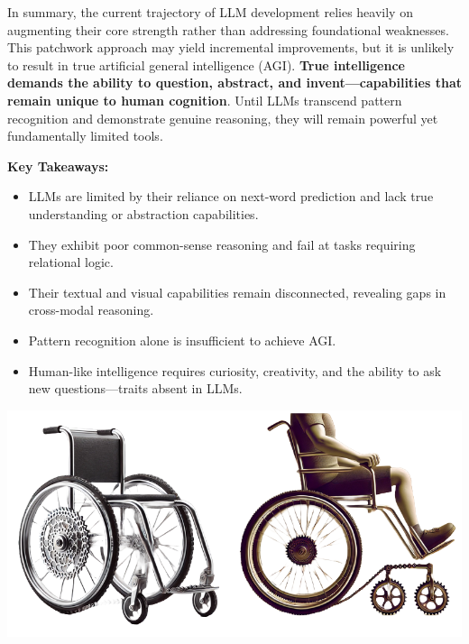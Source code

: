 \documentclass[11pt]{scrartcl}
\begin{document}
In summary, the current trajectory of LLM development relies heavily on augmenting their core strength rather than addressing foundational weaknesses. This patchwork approach may yield incremental improvements, but it is unlikely to result in true artificial general intelligence (AGI). \textbf{True intelligence demands the ability to question, abstract, and invent—capabilities that remain unique to human cognition}. Until LLMs transcend pattern recognition and demonstrate genuine reasoning, they will remain powerful yet fundamentally limited tools.

\vspace{1em}
\noindent
\textbf{Key Takeaways:}
\begin{itemize}
    \item LLMs are limited by their reliance on next-word prediction and lack true understanding or abstraction capabilities.
    \item They exhibit poor common-sense reasoning and fail at tasks requiring relational logic.
    \item Their textual and visual capabilities remain disconnected, revealing gaps in cross-modal reasoning.
    \item Pattern recognition alone is insufficient to achieve AGI.
    \item Human-like intelligence requires curiosity, creativity, and the ability to ask new questions—traits absent in LLMs.
\end{itemize}


\vspace{1cm}

\includegraphics[width=0.99\linewidth, center]{conclusion_image.png}

\vspace{1cm}
\end{document}
